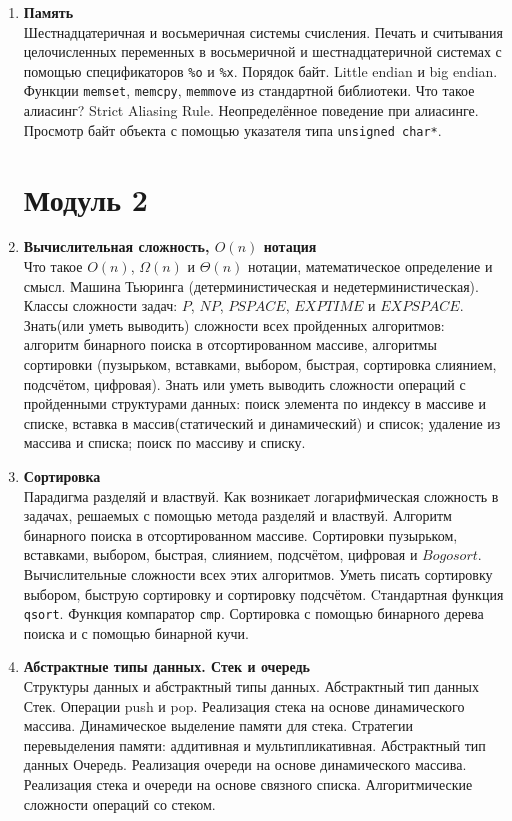 \documentclass{article}
\begin{document}
\begin{enumerate}
\item \textbf{Память}\\
Шестнадцатеричная и восьмеричная системы счисления. Печать и считывания целочисленных переменных в восьмеричной и шестнадцатеричной системах с помощью спецификаторов \texttt{\%o} и \texttt{\%x}. Порядок байт. Little endian и big endian.
Функции \texttt{memset}, \texttt{memcpy}, \texttt{memmove} из стандартной библиотеки. Что такое алиасинг? Strict Aliasing Rule. Неопределённое поведение при алиасинге. Просмотр байт объекта с помощью указателя типа \texttt{unsigned char*}.

\iffalse
\newpage
\section*{Модуль 2}
\item  \textbf{Вычислительная сложность, $O(n)$ нотация}\\
Что такое $O(n)$, $\Omega(n)$ и $\Theta(n)$ нотации, математическое определение и смысл. Машина Тьюринга (детерминистическая и недетерминистическая). Классы сложности задач: $P$, $NP$, $PSPACE$, $EXPTIME$ и $EXPSPACE$.
Знать(или уметь выводить) сложности всех пройденных алгоритмов: алгоритм бинарного поиска в отсортированном массиве, алгоритмы сортировки (пузырьком, вставками, выбором, быстрая, сортировка слиянием, подсчётом, цифровая). Знать или уметь выводить сложности операций с пройденными структурами данных: поиск элемента по индексу в массиве и списке, вставка в массив(статический и динамический) и список; удаление из массива и списка; поиск по массиву и списку.

\item \textbf{Сортировка}\\
Парадигма разделяй и властвуй. Как возникает логарифмическая сложность в задачах, решаемых с помощью метода разделяй и властвуй. Алгоритм бинарного поиска в отсортированном массиве.
Сортировки пузырьком, вставками, выбором, быстрая, слиянием, подсчётом, цифровая и $Bogosort$. Вычислительные сложности всех этих алгоритмов. Уметь писать сортировку выбором, быструю сортировку и сортировку подсчётом. Cтандартная функция \texttt{qsort}. Функция компаратор \texttt{cmp}. Сортировка с помощью бинарного дерева поиска и с помощью бинарной кучи.


\item  \textbf{Абстрактные типы данных. Стек и очередь}\\
Структуры данных и абстрактный типы данных. Абстрактный тип данных Стек. Операции push и pop. Реализация стека на основе динамического массива. Динамическое выделение памяти для стека. Стратегии перевыделения памяти: аддитивная и мультипликативная. Абстрактный тип данных Очередь. Реализация очереди на основе динамического массива. Реализация стека и очереди на основе связного списка. Алгоритмические сложности операций со стеком.


\end{enumerate}
\end{document}
